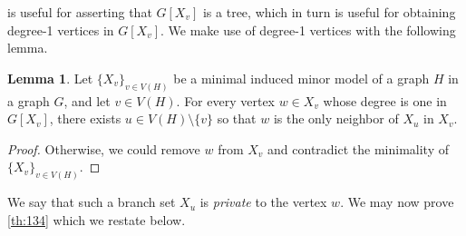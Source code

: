 \documentclass[11pt]{article}
\theoremstyle{definition}
\newtheorem{lemma}[theorem]{Lemma}
\theoremstyle{definition}
\begin{document}
 is useful for asserting that $G[X_v]$ is a
tree, which in turn is useful for obtaining degree-1 vertices in $G[X_v]$.
We make use of degree-1 vertices with the following lemma.

\begin{lemma}
\label{lem:deg1inbranch}
Let $\{X_v\}_{v \in V(H)}$ be a minimal induced minor model of a graph
$H$ in a graph $G$, and let $v \in V(H)$.  For every vertex
$w \in X_v$ whose degree is one in $G[X_v]$, there exists
$u \in V(H) \setminus \{v\}$ so that $w$ is the only neighbor of $X_u$
in $X_v$.
\end{lemma}
\begin{proof}
  Otherwise, we could remove $w$ from $X_v$ and contradict the
  minimality of $\{X_v\}_{v \in V(H)}$.
\end{proof}

We say that such a branch set $X_u$ is \emph{private} to the vertex $w$.
We may now prove \cref{th:134} which we restate below. 

\short*
\end{document}
